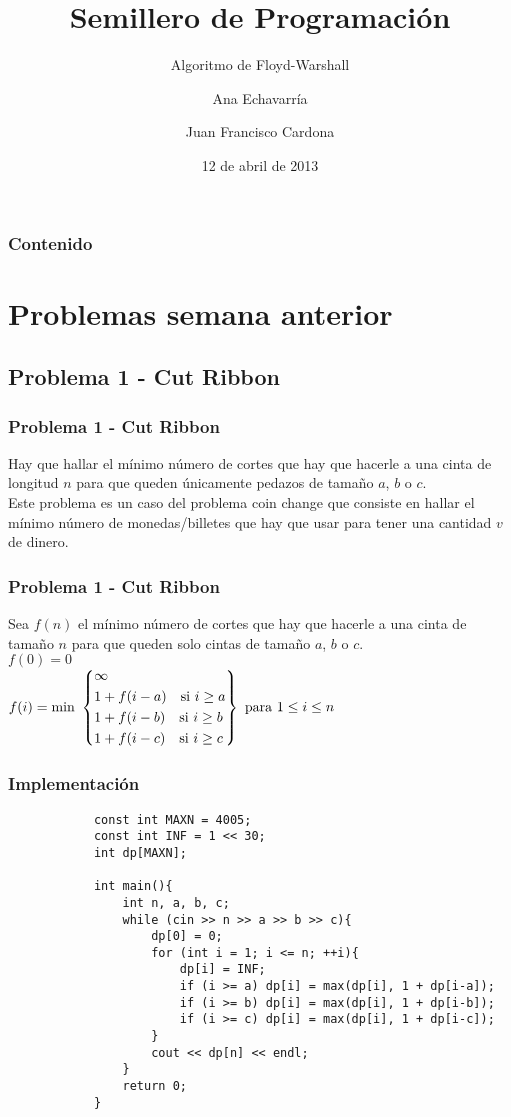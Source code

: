 \documentclass{beamer}
\title{Semillero de Programación}
\subtitle{Algoritmo de Floyd-Warshall}
\author{Ana Echavarría \and Juan Francisco Cardona}
\institute{Universidad EAFIT}
\date{12 de abril de 2013}
\begin{document}
\begin{frame}
	\titlepage
\end{frame}

\begin{frame}
	\frametitle{Contenido}
	\tableofcontents
\end{frame}

\section{Problemas semana anterior}
	\subsection{Problema 1 - Cut Ribbon}
	\begin{frame}
		\frametitle{Problema 1 - Cut Ribbon}
		Hay que hallar el mínimo número de cortes que hay que hacerle a una cinta de longitud $n$ para que queden únicamente pedazos de tamaño $a$, $b$ o $c$.\\
		Este problema es un caso del problema coin change que consiste en hallar el mínimo número de monedas/billetes que hay que usar para tener una cantidad $v$ de dinero.\\
	\end{frame}
	
	\begin{frame}
		\frametitle{Problema 1 - Cut Ribbon}
		Sea $f(n)$ el mínimo número de cortes que hay que hacerle a una cinta de tamaño $n$ para que queden solo cintas de tamaño $a$, $b$ o $c$.\\
		$f(0) = 0$ \\
		$
		f(i) =  \text{min } 
		\left\{
			\begin{aligned}
				& \infty\\
				& 1 + f(i-a) \text{\quad si } i \geq a\\
				& 1 + f(i-b) \text{\quad si } i \geq b\\
				& 1 + f(i-c) \text{\quad si } i \geq c\\
			\end{aligned}
		\right\}
		\text{ para } 
			\begin{aligned}
				& 1 \leq i \leq n\\
			\end{aligned}
		$
	\end{frame}
	
	\begin{frame}
		\frametitle{Implementación}
		\begin{lstlisting}
			const int MAXN = 4005;
			const int INF = 1 << 30;
			int dp[MAXN];

			int main(){
			    int n, a, b, c;
			    while (cin >> n >> a >> b >> c){
			        dp[0] = 0;
			        for (int i = 1; i <= n; ++i){
			            dp[i] = INF;
			            if (i >= a) dp[i] = max(dp[i], 1 + dp[i-a]);
			            if (i >= b) dp[i] = max(dp[i], 1 + dp[i-b]);
			            if (i >= c) dp[i] = max(dp[i], 1 + dp[i-c]);
			        }
			        cout << dp[n] << endl;
			    }
			    return 0;
			}
		\end{lstlisting}
	\end{frame}
	
\end{document}
